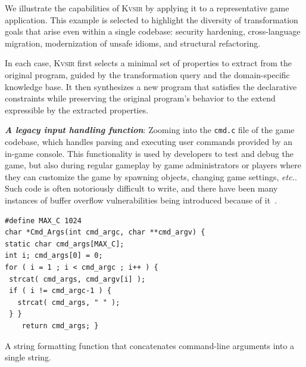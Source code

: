 \documentclass[sigplan,review,anonymous,10pt]{acmart}
\def\etc{{\em etc.}\xspace}
\newcommand{\sys}{{\scshape Kv{\textalpha}sir}\xspace}
\newcommand{\heading}[1]{\vspace{2pt}\noindent\textbf{\emph{#1}}:\enspace}
\newcommand{\ttt}[1]{\texttt{#1}\xspace}
\begin{document}
We illustrate the capabilities of \sys by applying it to a representative game
application.
This example is selected to highlight the
diversity of transformation goals that arise even within a single codebase:
security hardening, cross-language migration, modernization of unsafe idioms,
and structural refactoring.

In each case, \sys first selects a minimal set of properties to extract from
the original program, guided by the transformation query and the
domain-specific knowledge base.
It then synthesizes a new program that
satisfies the declarative constraints while preserving the original
program's behavior to the extend expressible by the extracted properties.

\heading{A legacy input handling function}
Zooming into the \ttt{cmd.c} file of the game codebase, 
which handles parsing and executing user commands provided by an in-game console.
This functionality is used by developers to test and debug the game, but also during regular gameplay
by game administrators or players where they can customize the game by spawning objects, changing game settings, \etc.
Such code is often notoriously difficult to write,
and there have been many instances of buffer overflow vulnerabilities being introduced because of it~\cite{CVE-2006-3400, CVE-2006-3401, CVE-2007-5248, CVE-2019-1010043}.
\begin{listing}
\begin{verbatim}
#define MAX_C 1024
char *Cmd_Args(int cmd_argc, char **cmd_argv) {
static char cmd_args[MAX_C];
int i; cmd_args[0] = 0;
for ( i = 1 ; i < cmd_argc ; i++ ) {
 strcat( cmd_args, cmd_argv[i] );
 if ( i != cmd_argc-1 ) {
   strcat( cmd_args, " " );
 } }
	return cmd_args; }
\end{verbatim}
\caption{A string formatting function that concatenates command-line arguments into a single string.}
\end{listing}
\end{document}
